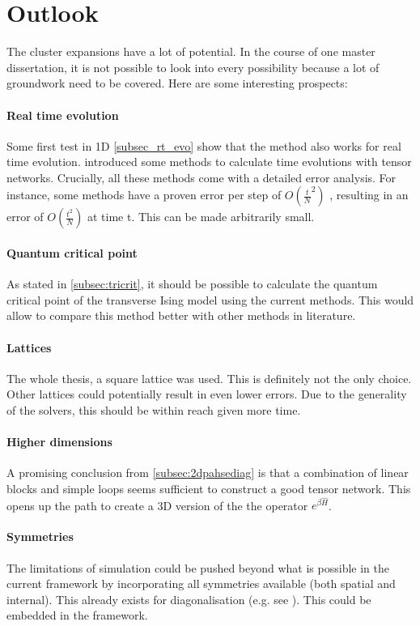 \section{Outlook}

The cluster expansions have a lot of potential. In the course of one master dissertation, it is not possible to look into every possibility because a lot of groundwork need to be covered. Here are some interesting prospects:

\paragraph{Real time evolution}

Some first test in 1D \cref{subsec_rt_evo} show that the method also works for real time evolution.  introduced some methods to calculate time evolutions with tensor networks. Crucially, all these methods come with a detailed error analysis. For instance, some methods have a proven error per step of $O \left( \frac{t}{N}^2  \right)$ , resulting in an error of $O \left( \frac{t^2}{N}  \right)$ at time t. This can be made arbitrarily small.

\paragraph{Quantum critical point}

As stated in \cref{subsec:tricrit}, it should be possible to calculate the quantum critical point of the transverse Ising model using the current methods. This would allow to compare this method better with other methods in literature.

\paragraph{Lattices}

The whole thesis, a square lattice was used. This is definitely not the only choice. Other lattices could potentially result in even lower errors. Due to the generality of the solvers, this should be within reach given more time.

\paragraph{Higher dimensions}

A promising conclusion from \cref{subsec:2dpahsediag} is that a combination of linear blocks and simple loops seems sufficient to construct a good tensor network. This opens up the path to create a 3D version of the the operator $e^{\beta \hat{H}}$.

\paragraph{Symmetries}

The limitations of simulation could be pushed beyond what is possible in the current framework by incorporating all symmetries available (both spatial and internal). This already exists for diagonalisation (e.g. see \cite{Wietek2018}). This could be embedded in the framework.
